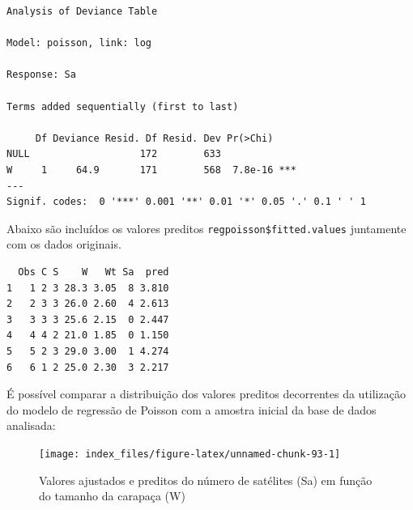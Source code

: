 \documentclass[12pt,brazil,oneside]{book}
\newenvironment{Shaded}{\begin{snugshade}}{\end{snugshade}}
\newcommand{\DataTypeTok}[1]{\textcolor[rgb]{0.13,0.29,0.53}{#1}}
\newcommand{\KeywordTok}[1]{\textcolor[rgb]{0.13,0.29,0.53}{\textbf{#1}}}
\newcommand{\NormalTok}[1]{#1}
\newcommand{\OperatorTok}[1]{\textcolor[rgb]{0.81,0.36,0.00}{\textbf{#1}}}
\newcommand{\StringTok}[1]{\textcolor[rgb]{0.31,0.60,0.02}{#1}}
\begin{document}
\begin{verbatim}
Analysis of Deviance Table

Model: poisson, link: log

Response: Sa

Terms added sequentially (first to last)

     Df Deviance Resid. Df Resid. Dev Pr(>Chi)    
NULL                   172        633             
W     1     64.9       171        568  7.8e-16 ***
---
Signif. codes:  0 '***' 0.001 '**' 0.01 '*' 0.05 '.' 0.1 ' ' 1
\end{verbatim}

Abaixo são incluídos os valores preditos
\texttt{regpoisson\$fitted.values} juntamente com os dados originais.

\begin{Shaded}
\end{Shaded}

\begin{verbatim}
  Obs C S    W   Wt Sa  pred
1   1 2 3 28.3 3.05  8 3.810
2   2 3 3 26.0 2.60  4 2.613
3   3 3 3 25.6 2.15  0 2.447
4   4 4 2 21.0 1.85  0 1.150
5   5 2 3 29.0 3.00  1 4.274
6   6 1 2 25.0 2.30  3 2.217
\end{verbatim}

É possível comparar a distribuição dos valores preditos decorrentes da
utilização do modelo de regressão de Poisson com a amostra inicial da
base de dados analisada:

\begin{Shaded}
\end{Shaded}

\begin{figure}[H]

{\centering \texttt{[image: index\_files/figure-latex/unnamed-chunk-93-1]} 

}

\caption{Valores ajustados e preditos do número de satélites (Sa) em função do tamanho da carapaça (W)}\label{fig:unnamed-chunk-93}
\end{figure}
\end{document}
